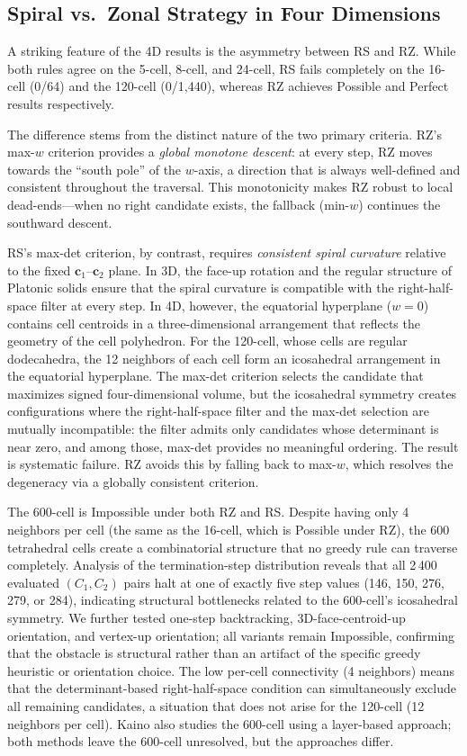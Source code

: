 \documentclass[12pt]{article}
\theoremstyle{definition}
\begin{document}
\subsection{Spiral vs.\ Zonal Strategy in Four Dimensions}

A striking feature of the 4D results is the asymmetry between RS and RZ.
While both rules agree on the 5-cell, 8-cell, and 24-cell, RS fails
completely on the 16-cell (0/64) and the 120-cell (0/1,440),
whereas RZ achieves Possible and Perfect results respectively.

The difference stems from the distinct nature of the two primary criteria.
RZ's max-$w$ criterion provides a \emph{global monotone descent}: at every
step, RZ moves towards the ``south pole'' of the $w$-axis, a direction that
is always well-defined and consistent throughout the traversal.
This monotonicity makes RZ robust to local dead-ends---when no right
candidate exists, the fallback (min-$w$) continues the southward descent.

RS's max-det criterion, by contrast, requires \emph{consistent spiral
curvature} relative to the fixed $\mathbf{c}_1$--$\mathbf{c}_2$ plane.
In 3D, the face-up rotation and the regular structure of Platonic solids
ensure that the spiral curvature is compatible with the right-half-space
filter at every step.
In 4D, however, the equatorial hyperplane ($w=0$) contains cell centroids
in a three-dimensional arrangement that reflects the geometry of the cell
polyhedron.
For the 120-cell, whose cells are regular dodecahedra, the 12 neighbors
of each cell form an icosahedral arrangement in the equatorial hyperplane.
The max-det criterion selects the candidate that maximizes signed
four-dimensional volume, but the icosahedral symmetry creates configurations
where the right-half-space filter and the max-det selection are mutually
incompatible: the filter admits only candidates whose determinant is
near zero, and among those, max-det provides no meaningful ordering.
The result is systematic failure.
RZ avoids this by falling back to max-$w$, which resolves the degeneracy
via a globally consistent criterion.

The 600-cell is Impossible under both RZ and RS.
Despite having only 4 neighbors per cell (the same as the 16-cell, which
is Possible under RZ), the 600 tetrahedral cells create a combinatorial
structure that no greedy rule can traverse completely.
Analysis of the termination-step distribution reveals that all 2\,400
evaluated $(C_1, C_2)$ pairs halt at one of exactly five step values
(146, 150, 276, 279, or 284), indicating structural bottlenecks related
to the 600-cell's icosahedral symmetry.
We further tested one-step backtracking, 3D-face-centroid-up orientation,
and vertex-up orientation; all variants remain Impossible,
confirming that the obstacle is structural rather than an artifact
of the specific greedy heuristic or orientation choice.
The low per-cell connectivity (4 neighbors) means that the
determinant-based right-half-space condition can simultaneously exclude
all remaining candidates, a situation that does not arise for the
120-cell (12 neighbors per cell).
Kaino \cite{Kaino2019} also studies the 600-cell using a layer-based
approach; both methods leave the 600-cell unresolved, but the
approaches differ.
\end{document}
